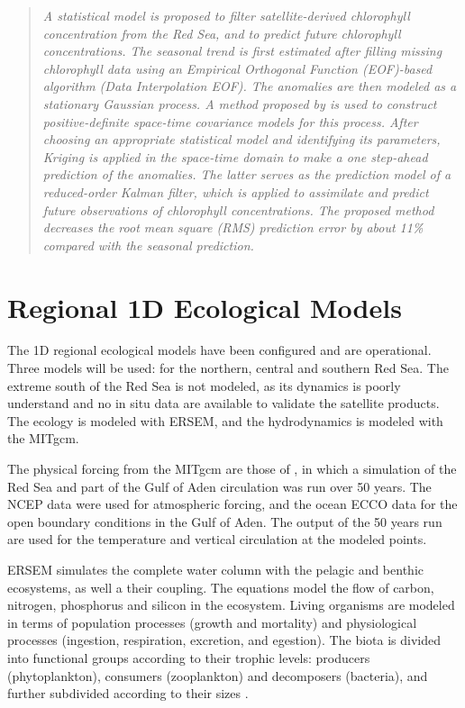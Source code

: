 \begin{quotation}
\emph{A statistical model is proposed to filter satellite-derived chlorophyll
concentration from the Red Sea, and to predict future chlorophyll
concentrations. The seasonal trend is first estimated after filling missing
chlorophyll data using an Empirical Orthogonal Function (EOF)-based algorithm
(Data Interpolation EOF). The anomalies are then modeled as a stationary
Gaussian process. A method proposed by \citet{Gneiting2002} is used to
construct positive-definite space-time covariance models for this process.
After choosing an appropriate statistical model and identifying its parameters,
Kriging is applied in the space-time domain to make a one step-ahead prediction
of the anomalies. The latter serves as the prediction model of a reduced-order
Kalman filter, which is applied to assimilate and predict future observations
of chlorophyll concentrations. The proposed method decreases the root mean
square (RMS) prediction error by about 11\% compared with the seasonal
prediction.}
\end{quotation}

\section{Regional 1D Ecological Models}

The 1D regional ecological models have been configured and
are operational. Three models will be used: for the northern, central and
southern Red Sea. The extreme south of the Red Sea is not modeled, as its
dynamics is poorly understand and no in situ data are available to validate the
satellite products. The ecology is modeled with ERSEM, and the hydrodynamics
is modeled with the MITgcm.

The physical forcing from the MITgcm are those of \citet{Yao2014, Yao2014b}, in
which a simulation of the Red Sea and part of the Gulf of Aden circulation was
run over 50 years. The NCEP data were used for atmospheric forcing, and the
ocean ECCO data for the open boundary conditions in the Gulf of Aden. The
output of the 50 years run are used for the temperature and vertical
circulation at the modeled points.

ERSEM simulates the complete water column with the pelagic and benthic
ecosystems, as well a their coupling. The equations model the flow of carbon,
nitrogen, phosphorus and silicon in the ecosystem. Living organisms are modeled
in terms of population processes (growth and mortality) and physiological
processes (ingestion, respiration, excretion, and egestion). The biota is
divided into functional groups according to their trophic levels: producers
(phytoplankton), consumers (zooplankton) and decomposers (bacteria), and
further subdivided according to their sizes \citep{Baretta1995}.

